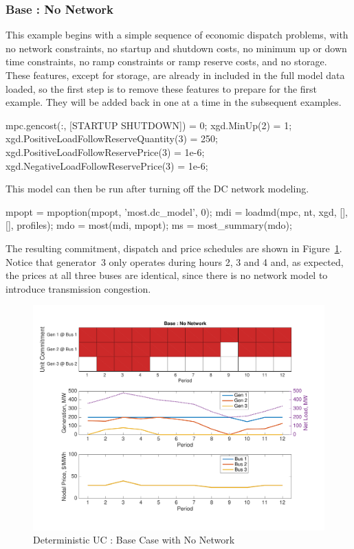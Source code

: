 \documentclass[12pt]{article}
\numberwithin{equation}{section}
\numberwithin{table}{section}
\numberwithin{figure}{section}
\begin{document}
\subsubsection*{Base : No Network}
This example begins with a simple sequence of economic dispatch problems, with no network constraints, no startup and shutdown costs, no minimum up or down time constraints, no ramp constraints or ramp reserve costs, and no storage. These features, except for storage, are already in included in the full model data loaded, so the first step is to remove these features to prepare for the first example. They will be added back in one at a time in the subsequent examples.
\begin{Code}
mpc.gencost(:, [STARTUP SHUTDOWN]) = 0; %
xgd.MinUp(2) = 1;                       %
xgd.PositiveLoadFollowReserveQuantity(3) = 250; %
xgd.PositiveLoadFollowReservePrice(3) = 1e-6;   %
xgd.NegativeLoadFollowReservePrice(3) = 1e-6;
\end{Code}
This model can then be run after turning off the DC network modeling.
\begin{Code}
mpopt = mpoption(mpopt, 'most.dc_model', 0);    %
mdi = loadmd(mpc, nt, xgd, [], [], profiles);
mdo = most(mdi, mpopt);
ms = most_summary(mdo);     %
\end{Code}
The resulting commitment, dispatch and price schedules are shown in Figure~\ref{fig:uc_ex_1}. Notice that generator~3 only operates during hours 2, 3 and 4 and, as expected, the prices at all three buses are identical, since there is no network model to introduce transmission congestion.
\begin{figure}[hbtp]
  \centering
  \includegraphics[width=\textwidth]{./figures/uc-ex-1}
  \caption{Deterministic UC : Base Case with No Network}
  \label{fig:uc_ex_1}
\end{figure}
\end{document}
